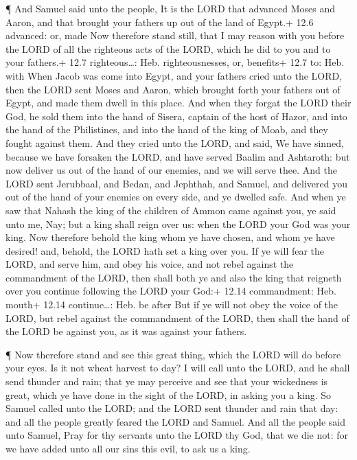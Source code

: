  ¶ And Samuel said unto the people, It is the LORD that
advanced Moses and Aaron, and that brought your fathers up out of the
land of Egypt.+ 12.6 advanced: or, made  Now therefore stand
still, that I may reason with you before the LORD of all the righteous
acts of the LORD, which he did to you and to your fathers.+ 12.7
righteous\ldots: Heb. righteousnesses, or, benefits+ 12.7 to: Heb. with
 When Jacob was come into Egypt, and your fathers cried unto
the LORD, then the LORD sent Moses and Aaron, which brought forth your
fathers out of Egypt, and made them dwell in this place. 
And when they forgat the LORD their God, he sold them into the hand of
Sisera, captain of the host of Hazor, and into the hand of the
Philistines, and into the hand of the king of Moab, and they fought
against them.  And they cried unto the LORD, and said, We
have sinned, because we have forsaken the LORD, and have served Baalim
and Ashtaroth: but now deliver us out of the hand of our enemies, and we
will serve thee.  And the LORD sent Jerubbaal, and Bedan,
and Jephthah, and Samuel, and delivered you out of the hand of your
enemies on every side, and ye dwelled safe.  And when ye
saw that Nahash the king of the children of Ammon came against you, ye
said unto me, Nay; but a king shall reign over us: when the LORD your
God was your king.  Now therefore behold the king whom ye
have chosen, and whom ye have desired! and, behold, the LORD hath set a
king over you.  If ye will fear the LORD, and serve him,
and obey his voice, and not rebel against the commandment of the LORD,
then shall both ye and also the king that reigneth over you continue
following the LORD your God:+ 12.14 commandment: Heb. mouth+ 12.14
continue\ldots: Heb. be after  But if ye will not obey the
voice of the LORD, but rebel against the commandment of the LORD, then
shall the hand of the LORD be against you, as it was against your
fathers.

 ¶ Now therefore stand and see this great thing, which the
LORD will do before your eyes.  Is it not wheat harvest to
day? I will call unto the LORD, and he shall send thunder and rain; that
ye may perceive and see that your wickedness is great, which ye have
done in the sight of the LORD, in asking you a king.  So
Samuel called unto the LORD; and the LORD sent thunder and rain that
day: and all the people greatly feared the LORD and Samuel.
 And all the people said unto Samuel, Pray for thy servants
unto the LORD thy God, that we die not: for we have added unto all our
sins this evil, to ask us a king.

